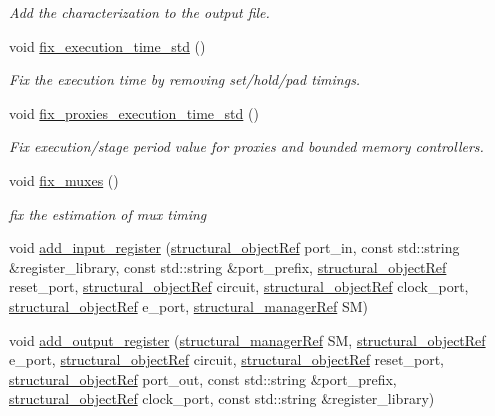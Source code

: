 \begin{DoxyCompactItemize}
\begin{DoxyCompactList}\small\item\em Add the characterization to the output file. \end{DoxyCompactList}\item 
void \hyperlink{classRTLCharacterization_aac3182b7f98299ce58876579de647ad3}{fix\+\_\+execution\+\_\+time\+\_\+std} ()
\begin{DoxyCompactList}\small\item\em Fix the execution time by removing set/hold/pad timings. \end{DoxyCompactList}\item 
void \hyperlink{classRTLCharacterization_a92793e13528e187fc9c662ebc5ef7abe}{fix\+\_\+proxies\+\_\+execution\+\_\+time\+\_\+std} ()
\begin{DoxyCompactList}\small\item\em Fix execution/stage period value for proxies and bounded memory controllers. \end{DoxyCompactList}\item 
void \hyperlink{classRTLCharacterization_a5f3dcbe12f62ab3c698e9802d9caf145}{fix\+\_\+muxes} ()
\begin{DoxyCompactList}\small\item\em fix the estimation of mux timing \end{DoxyCompactList}\item 
void \hyperlink{classRTLCharacterization_ad2f002aeb10b1a41ff125d87580bc507}{add\+\_\+input\+\_\+register} (\hyperlink{structural__objects_8hpp_a8ea5f8cc50ab8f4c31e2751074ff60b2}{structural\+\_\+object\+Ref} port\+\_\+in, const std\+::string \&register\+\_\+library, const std\+::string \&port\+\_\+prefix, \hyperlink{structural__objects_8hpp_a8ea5f8cc50ab8f4c31e2751074ff60b2}{structural\+\_\+object\+Ref} reset\+\_\+port, \hyperlink{structural__objects_8hpp_a8ea5f8cc50ab8f4c31e2751074ff60b2}{structural\+\_\+object\+Ref} circuit, \hyperlink{structural__objects_8hpp_a8ea5f8cc50ab8f4c31e2751074ff60b2}{structural\+\_\+object\+Ref} clock\+\_\+port, \hyperlink{structural__objects_8hpp_a8ea5f8cc50ab8f4c31e2751074ff60b2}{structural\+\_\+object\+Ref} e\+\_\+port, \hyperlink{structural__manager_8hpp_ab3136f0e785d8535f8d252a7b53db5b5}{structural\+\_\+manager\+Ref} SM)
\item 
void \hyperlink{classRTLCharacterization_a8da7aeea42687af7ad61a61574874de1}{add\+\_\+output\+\_\+register} (\hyperlink{structural__manager_8hpp_ab3136f0e785d8535f8d252a7b53db5b5}{structural\+\_\+manager\+Ref} SM, \hyperlink{structural__objects_8hpp_a8ea5f8cc50ab8f4c31e2751074ff60b2}{structural\+\_\+object\+Ref} e\+\_\+port, \hyperlink{structural__objects_8hpp_a8ea5f8cc50ab8f4c31e2751074ff60b2}{structural\+\_\+object\+Ref} circuit, \hyperlink{structural__objects_8hpp_a8ea5f8cc50ab8f4c31e2751074ff60b2}{structural\+\_\+object\+Ref} reset\+\_\+port, \hyperlink{structural__objects_8hpp_a8ea5f8cc50ab8f4c31e2751074ff60b2}{structural\+\_\+object\+Ref} port\+\_\+out, const std\+::string \&port\+\_\+prefix, \hyperlink{structural__objects_8hpp_a8ea5f8cc50ab8f4c31e2751074ff60b2}{structural\+\_\+object\+Ref} clock\+\_\+port, const std\+::string \&register\+\_\+library)

\end{DoxyCompactItemize}
